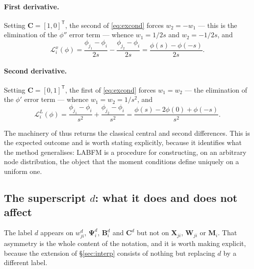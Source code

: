\documentclass[11pt,a4paper]{article}
\begin{document}
\paragraph{First derivative.} Setting $\bm C=[1,0]^{\mathsf T}$, the second of
\eqref{eq:excond} forces $w_2=-w_1$ --- this is the elimination of the $\phi''$ error
term --- whence $w_1=1/2s$ and $w_2=-1/2s$, and
\begin{equation}
\mathcal L^{x}_i(\phi)=\frac{\phi_{j_1}-\phi_i}{2s}-\frac{\phi_{j_2}-\phi_i}{2s}
=\frac{\phi(s)-\phi(-s)}{2s}.
\label{eq:excd1}
\end{equation}

\paragraph{Second derivative.} Setting $\bm C=[0,1]^{\mathsf T}$, the first of
\eqref{eq:excond} forces $w_1=w_2$ --- the elimination of the $\phi'$ error term ---
whence $w_1=w_2=1/s^{2}$, and
\begin{equation}
\mathcal L^{L}_i(\phi)=\frac{\phi_{j_1}-\phi_i}{s^{2}}+\frac{\phi_{j_2}-\phi_i}{s^{2}}
=\frac{\phi(s)-2\phi(0)+\phi(-s)}{s^{2}}.
\label{eq:excd2}
\end{equation}

The machinery of \cite[\S 3.1]{KLN2020} thus returns the classical central and second
differences. This is the expected outcome and is worth stating explicitly, because it
identifies what the method generalises: LABFM is a procedure for constructing, on an
arbitrary node distribution, the object that the moment conditions define uniquely on a
uniform one.

\subsection{The superscript \texorpdfstring{$d$}{d}: what it does and does not affect}
\label{app:super-d}

The label $d$ appears on $w^{d}_{ji}$, $\bm\Psi^{d}_i$, $\bm B^{d}_i$ and $\bm C^{d}$
but not on $\bm X_{ji}$, $\bm W_{ji}$ or $\bm M_i$. That asymmetry is the whole content
of the notation, and it is worth making explicit, because the extension of
\S\ref{sec:interp} consists of nothing but replacing $d$ by a different label.
\end{document}
